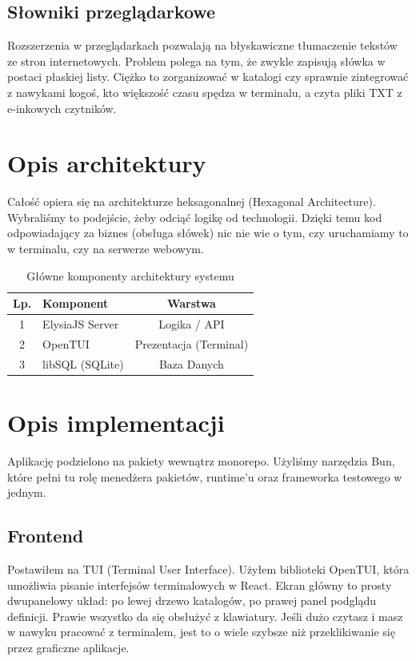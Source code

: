 \documentclass[times]{san}
\begin{document}
\subsection{Słowniki przeglądarkowe}
Rozszerzenia w przeglądarkach pozwalają na błyskawiczne tłumaczenie tekstów ze stron internetowych. Problem polega na tym, że zwykle zapisują słówka w postaci płaskiej listy. Ciężko to zorganizować w katalogi czy sprawnie zintegrować z nawykami kogoś, kto większość czasu spędza w terminalu, a czyta pliki TXT z e-inkowych czytników.

\section{Opis architektury}

Całość opiera się na architekturze heksagonalnej (Hexagonal Architecture). Wybraliśmy to podejście, żeby odciąć logikę od technologii. Dzięki temu kod odpowiadający za biznes (obsługa słówek) nic nie wie o tym, czy uruchamiamy to w terminalu, czy na serwerze webowym.

\begin{table}[h]
\centering
\caption{Główne komponenty architektury systemu}
\label{tab:lorem}
\begin{tabular}{|c|l|c|}
\hline
Lp. & Komponent          & Warstwa \\
\hline
1   & ElysiaJS Server    & Logika / API \\
2   & OpenTUI            & Prezentacja (Terminal) \\
3   & libSQL (SQLite)    & Baza Danych \\
\hline
\end{tabular}
\end{table}

\section{Opis implementacji}

Aplikację podzielono na pakiety wewnątrz monorepo. Użyliśmy narzędzia Bun, które pełni tu rolę menedżera pakietów, runtime'u oraz frameworka testowego w jednym.

\subsection{Frontend}
Postawiłem na TUI (Terminal User Interface). Użyłem biblioteki OpenTUI, która umożliwia pisanie interfejsów terminalowych w React. Ekran główny to prosty dwupanelowy układ: po lewej drzewo katalogów, po prawej panel podglądu definicji. Prawie wszystko da się obsłużyć z klawiatury. Jeśli dużo czytasz i masz w nawyku pracować z terminalem, jest to o wiele szybsze niż przeklikiwanie się przez graficzne aplikacje.
\end{document}
